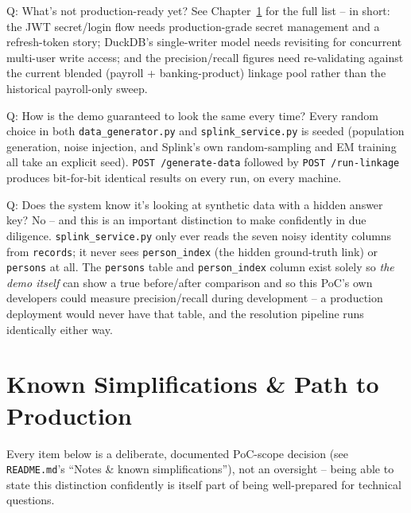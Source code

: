 \documentclass[11pt]{report}
\begin{document}
\begin{qabox}{Q: What's not production-ready yet?}
See Chapter~\ref{ch:limitations} for the full list -- in short: the JWT secret/login flow needs production-grade secret management and a refresh-token story; DuckDB's single-writer model needs revisiting for concurrent multi-user write access; and the precision/recall figures need re-validating against the current blended (payroll + banking-product) linkage pool rather than the historical payroll-only sweep.
\end{qabox}

\begin{qabox}{Q: How is the demo guaranteed to look the same every time?}
Every random choice in both \texttt{data\_generator.py} and \texttt{splink\_service.py} is seeded (population generation, noise injection, and Splink's own random-sampling and EM training all take an explicit seed). \texttt{POST /generate-data} followed by \texttt{POST /run-linkage} produces bit-for-bit identical results on every run, on every machine.
\end{qabox}

\begin{qabox}{Q: Does the system know it's looking at synthetic data with a hidden answer key?}
No -- and this is an important distinction to make confidently in due diligence. \texttt{splink\_service.py} only ever reads the seven noisy identity columns from \texttt{records}; it never sees \texttt{person\_index} (the hidden ground-truth link) or \texttt{persons} at all. The \texttt{persons} table and \texttt{person\_index} column exist solely so \emph{the demo itself} can show a true before/after comparison and so this PoC's own developers could measure precision/recall during development -- a production deployment would never have that table, and the resolution pipeline runs identically either way.
\end{qabox}

\chapter{Known Simplifications \& Path to Production}
\label{ch:limitations}

Every item below is a deliberate, documented PoC-scope decision (see \texttt{README.md}'s ``Notes \& known simplifications''), not an oversight -- being able to state this distinction confidently is itself part of being well-prepared for technical questions.
\end{document}
